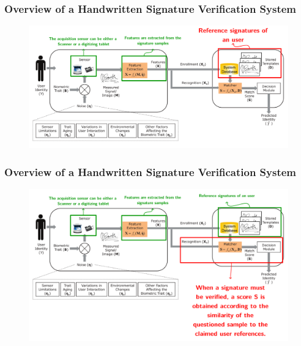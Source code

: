 \documentclass{beamer}
\begin{document}
\begin{frame}
\frametitle{Overview of a Handwritten Signature Verification System}
\begin{figure}[!htb]
\centering
\includegraphics[width=\textwidth]{biometryoverview4}

\label{fig_ahsv-overview}
\end{figure}

\end{frame}


\begin{frame}
\frametitle{Overview of a Handwritten Signature Verification System}
\begin{figure}[!htb]
\centering
\includegraphics[width=\textwidth]{biometryoverview5}

\label{fig_ahsv-overview}
\end{figure}

\end{frame}
\end{document}
